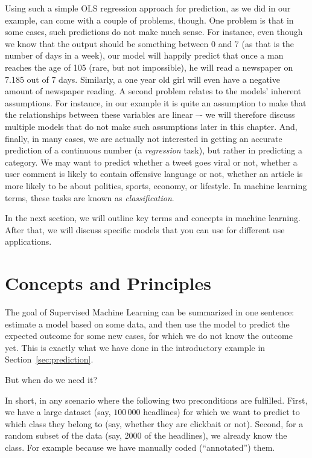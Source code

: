 Using such a simple OLS regression approach for prediction, as we did in our example, can come with a couple of problems, though. One problem is that in some cases, such predictions do not make much sense. For instance, even though we know that the output should be something between 0 and 7 (as that is the number of days in a week), our model will happily predict that once a man reaches the age of 105 (rare, but not impossible), he will read a newspaper on 7.185 out of 7 days. Similarly, a one year old girl will even have a negative amount of newspaper reading. A second problem relates to the models' inherent assumptions. For instance, in our example it is quite an assumption to make that the relationships between these variables are linear –- we will therefore discuss multiple models that do not make such assumptions later in this chapter. And, finally, in many cases, we are actually not interested in getting an accurate prediction of a continuous number (a \textit{regression} task), but rather in predicting a category. We may want to predict whether a tweet goes viral or not, whether a user comment is likely to contain offensive language or not, whether an article is more likely to be about politics, sports, economy, or lifestyle. In machine learning terms, these tasks are known as \textit{classification}.

In the next section, we will outline key terms and concepts in machine
learning. After that, we will discuss specific models that you
can use for different use applications.


%
\section{Concepts and Principles}
\label{sec:principles}

The goal of Supervised Machine Learning can be summarized in one sentence:
estimate a model based on some data, and then use the model to predict the
expected outcome for some new cases, for which we do not know the outcome yet.
This is exactly what we have done in the introductory example in Section~\ref{sec:prediction}.

But when do we need it?

In short, in any scenario where the following two preconditions are fulfilled.
First, we have a large dataset (say, $100\,000$
headlines) for which we want to predict to which class they belong to (say, whether
they are clickbait or not).
Second, for a random subset of the data (say, $2000$ of the headlines), we already
know the class.
For example because we have manually coded (``annotated'') them.

